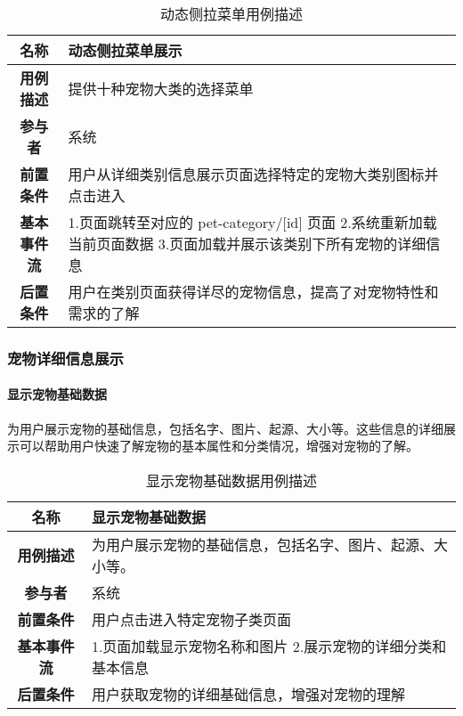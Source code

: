 \begin{table}[H]
	\centering
	\caption{动态侧拉菜单用例描述}
	\renewcommand\arraystretch{1.5}
	\begin{tabular}{|c|>{\raggedright\arraybackslash}p{10cm}|}
		\hline
		\textbf{名称} & \textbf{动态侧拉菜单展示} \\ \hline
		\textbf{用例描述} & 提供十种宠物大类的选择菜单 \\ \hline
		\textbf{参与者} & 系统 \\ \hline
		\textbf{前置条件} & 用户从详细类别信息展示页面选择特定的宠物大类别图标并点击进入 \\ \hline
		\textbf{基本事件流} &
		1.页面跳转至对应的 pet-category/[id] 页面\newline
		2.系统重新加载当前页面数据\newline
		3.页面加载并展示该类别下所有宠物的详细信息\\
		\hline
		\textbf{后置条件} & 用户在类别页面获得详尽的宠物信息，提高了对宠物特性和需求的了解 \\ \hline
	\end{tabular}
\end{table}

\subsubsection{宠物详细信息展示}

\paragraph{显示宠物基础数据}

为用户展示宠物的基础信息，包括名字、图片、起源、大小等。这些信息的详细展示可以帮助用户快速了解宠物的基本属性和分类情况，增强对宠物的了解。

\begin{table}[H]
	\centering
	\caption{显示宠物基础数据用例描述}
	\renewcommand\arraystretch{1.5}
	\begin{tabular}{|c|>{\raggedright\arraybackslash}p{10cm}|}
		\hline
		\textbf{名称} & \textbf{显示宠物基础数据} \\ \hline
		\textbf{用例描述} & 为用户展示宠物的基础信息，包括名字、图片、起源、大小等。 \\ \hline
		\textbf{参与者} & 系统 \\ \hline
		\textbf{前置条件} & 用户点击进入特定宠物子类页面 \\ \hline
		\textbf{基本事件流} & 
		1.页面加载显示宠物名称和图片\newline
		2.展示宠物的详细分类和基本信息\\
		\hline
		\textbf{后置条件} & 用户获取宠物的详细基础信息，增强对宠物的理解 \\ \hline
	\end{tabular}
\end{table}

